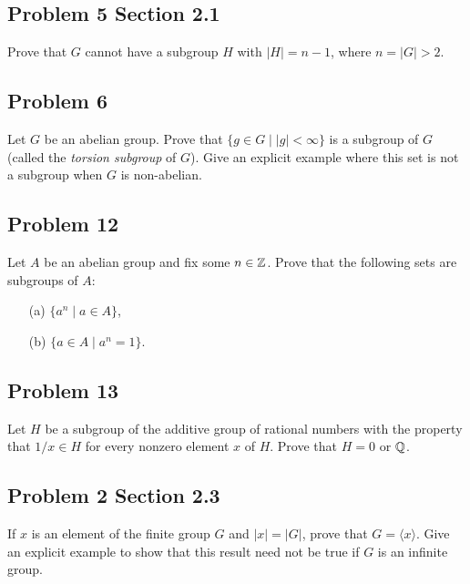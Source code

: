 \subsection{Problem 5 Section 2.1}
\begin{prob}
    Prove that $G$ cannot have a subgroup $H$ with $|H|=n-1$, where $n=|G|>2$.
\end{prob}

\subsection{Problem 6}
\begin{prob}
    Let $G$ be an abelian group. Prove that $\{g\in G \mid |g| < \infty\} $ is a subgroup of $G$ (called the \emph{torsion subgroup} of $G$). Give an explicit example where this set is not a subgroup when $G$ is non-abelian.
\end{prob}

\subsection{Problem 12}
\begin{prob}
    Let $A$ be an abelian group and fix some $n\in \mathbb{Z}$. Prove that the following sets are subgroups of $A$: 
    \begin{enumerate}
        \item[(a)] $\{a^{n} \mid a\in A\} $,
        \item[(b)] $\{a\in A \mid a^{n}=1\} $.
    \end{enumerate}
\end{prob}

\subsection{Problem 13}
\begin{prob}
    Let $H$ be a subgroup of the additive group of rational numbers with the property that $1/x \in H$ for every nonzero element $x$ of $H$. Prove that $H=0$ or $\mathbb{Q}$.
\end{prob}

\subsection{Problem 2 Section 2.3}
\begin{prob}
    If $x$ is an element of the finite group $G$ and $|x|=|G|$, prove that $G=\langle x \rangle .$ Give an explicit example to show that this result need not be true if $G$ is an infinite group.
\end{prob}

